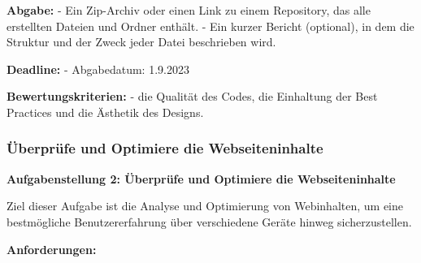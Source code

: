 \documentclass[12pt,a4paper]{scrartcl}
\begin{document}
\textbf{Abgabe:} - Ein Zip-Archiv oder einen Link zu einem Repository,
das alle erstellten Dateien und Ordner enthält. - Ein kurzer Bericht
(optional), in dem die Struktur und der Zweck jeder Datei beschrieben
wird.

\textbf{Deadline:} - Abgabedatum: 1.9.2023

\textbf{Bewertungskriterien:} - die Qualität des Codes, die Einhaltung
der Best Practices und die Ästhetik des Designs.

\hypertarget{uxfcberpruxfcfe-und-optimiere-die-webseiteninhalte}{%
\subsubsection{Überprüfe und Optimiere die
Webseiteninhalte}\label{uxfcberpruxfcfe-und-optimiere-die-webseiteninhalte}}

\textbf{Aufgabenstellung 2: Überprüfe und Optimiere die
Webseiteninhalte}

Ziel dieser Aufgabe ist die Analyse und Optimierung von Webinhalten, um
eine bestmögliche Benutzererfahrung über verschiedene Geräte hinweg
sicherzustellen.

\textbf{Anforderungen:}
\end{document}
